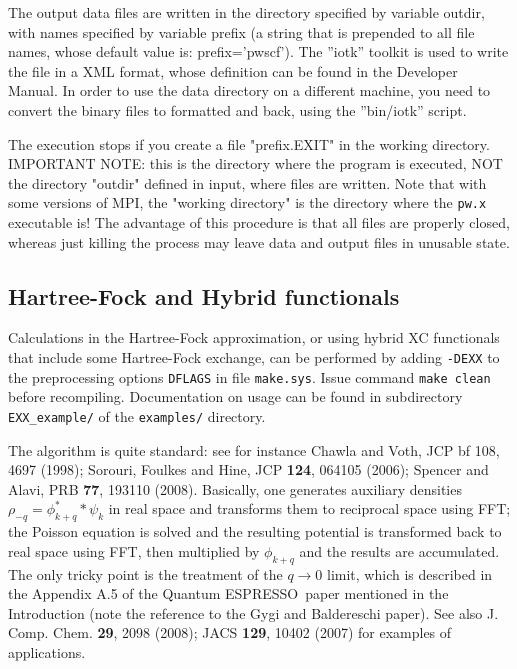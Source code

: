 \documentclass[12pt,a4paper]{article}
\def\qe{{\sc Quantum ESPRESSO}}
\def\pw.x{\texttt{pw.x}}
\begin{document}
The output data files are written in the directory specified by variable
outdir, with names specified by variable prefix (a string that is prepended
to all file names, whose default value is: prefix='pwscf'). The ''iotk''
toolkit is used to write the file in a XML format, whose definition can
be found in the Developer Manual. In order to use the data directory
on a different machine, you need to convert the binary files to formatted
and back, using the ''bin/iotk'' script.

The execution stops if you create a file "prefix.EXIT" in the working 
directory. IMPORTANT NOTE: this is the directory where the program 
is executed, NOT the directory "outdir" defined in input, where files 
are written. Note that with some versions of MPI, the "working directory" 
is the directory where the \pw.x executable is! The advantage of this 
procedure is that all files are properly closed, whereas  just killing 
the process may leave data and output files in unusable state.

\subsection{Hartree-Fock and Hybrid functionals}

Calculations in the Hartree-Fock approximation, or using hybrid XC functionals 
that include some Hartree-Fock exchange, can be performed by adding
\texttt{-DEXX} to the preprocessing options \texttt{DFLAGS} in file 
\texttt{make.sys}. Issue command \texttt{make clean} before recompiling. 
Documentation on usage can be found in subdirectory \texttt{EXX\_example/}
of the \texttt{examples/} directory.

The algorithm is quite standard: see for instance Chawla and Voth, 
JCP {bf 108}, 4697 (1998); Sorouri, Foulkes and Hine, JCP {\bf 124}, 
064105 (2006); Spencer and Alavi, PRB {\bf 77}, 193110 (2008). 
Basically, one generates auxiliary densities $\rho_{-q}=\phi^{*}_{k+q}*\psi_k$
in real space and transforms them to reciprocal space using FFT;
the Poisson equation is solved and the resulting potential is transformed 
back to real space using FFT, then multiplied by $\phi_{k+q}$ and the
results are accumulated.
The only tricky point is the treatment of the $q\rightarrow 0$ limit,
which is described in the Appendix A.5 of the \qe\ paper mentioned 
in the Introduction (note the reference to the Gygi and Baldereschi paper). 
See also J. Comp. Chem. {\bf 29}, 2098 (2008);
JACS {\bf 129}, 10402 (2007) for examples of applications.
\end{document}
